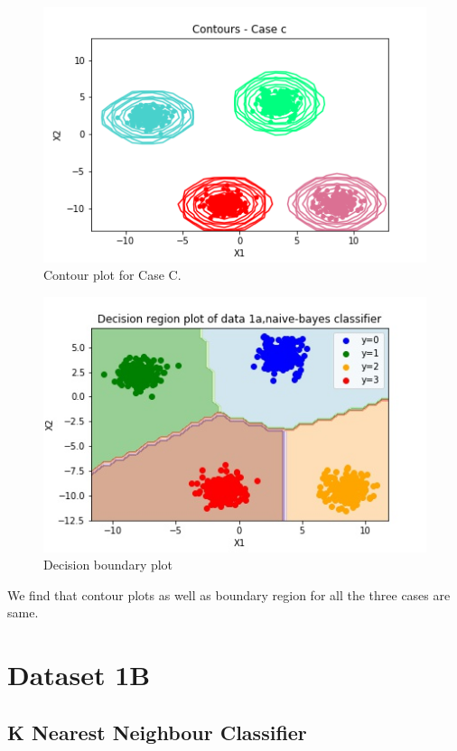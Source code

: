 \documentclass[11pt,a4paper]{article}
\newcommand{\noi}{\noindent}
\begin{document}
\begin{figure}[H]
    \centering
    \includegraphics[scale=0.6]{images/contour1b_case3.png}
    \caption{Contour plot for Case C.}
    \label{fig:cp_3}
\end{figure}

\begin{figure}[H]
    \centering
    \includegraphics[scale=1]{images/1A_nb_case1_decisionregion.jpg}
    \caption{Decision boundary plot}
    \label{fig:db1}
\end{figure}

\noi
We find that contour plots as well as boundary region for all the three cases are same. 

\break
\section{Dataset 1B}
\subsection{K Nearest Neighbour Classifier} 
\end{document}
